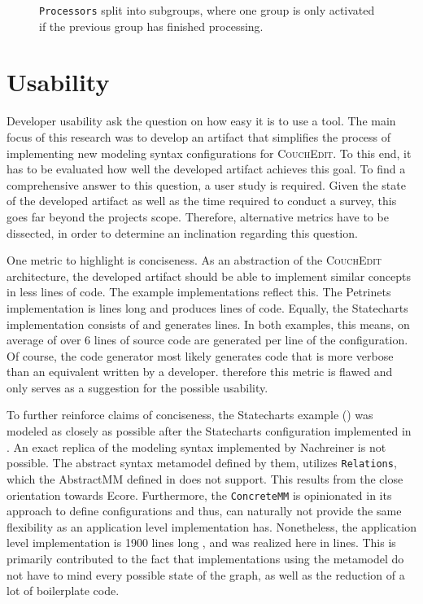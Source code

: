 \begin{figure}
\centering

\caption{\texttt{Processors} split into subgroups, where one group is only activated if the previous group has finished processing.}
\label{fig:sub-groups}
\end{figure}

\section{Usability}
Developer usability ask the question on how easy it is to use a tool. The main focus of this research was to develop an artifact that simplifies the process of implementing new modeling syntax configurations for \textsc{CouchEdit}. To this end, it has to be evaluated how well the developed artifact achieves this goal. To find a comprehensive answer to this question, a user study is required. Given the state of the developed artifact as well as the time required to conduct a survey, this goes far beyond the projects scope. Therefore, alternative metrics have to be dissected, in order to determine an inclination regarding this question. 

One metric to highlight is conciseness. As an abstraction of the \textsc{CouchEdit} architecture, the developed artifact should be able to implement similar concepts in less lines of code. The example implementations reflect this. The Petrinets implementation is \petriConfigLoC lines long and produces \petriGeneratedLoC lines of code. Equally, the Statecharts implementation consists of \stateConfigLoC and generates \stateGeneratedLoC lines. In both examples, this means, on average of over 6 lines of source code are generated per line of the configuration. Of course, the code generator most likely generates code that is more verbose than an equivalent written by a developer. therefore this metric is flawed and only serves as a suggestion for the possible usability. 

To further reinforce claims of conciseness, the Statecharts example () was modeled as closely as possible after the Statecharts configuration implemented in \cite{nachreiner_couchedit_2020}. An exact replica of the modeling syntax implemented by Nachreiner is not possible. The abstract syntax metamodel defined by them, utilizes \texttt{Relations}, which the AbstractMM defined in  does not support. This results from the close orientation towards Ecore. Furthermore, the \texttt{ConcreteMM} is opinionated in its approach to define configurations and thus, can naturally not provide the same flexibility as an application level implementation has. Nonetheless, the application level implementation is 1900 lines long \cite{nachreiner_couchedit_2020}, and was realized here in \stateConfigLoC lines. This is primarily contributed to the fact that implementations using the metamodel do not have to mind every possible state of the graph, as well as the reduction of a lot of boilerplate code.

